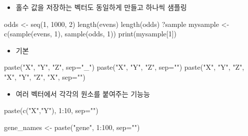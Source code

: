 \documentclass[
]{book}
\newenvironment{Shaded}{\begin{snugshade}}{\end{snugshade}}
\newcommand{\AttributeTok}[1]{\textcolor[rgb]{0.77,0.63,0.00}{#1}}
\newcommand{\DecValTok}[1]{\textcolor[rgb]{0.00,0.00,0.81}{#1}}
\newcommand{\FunctionTok}[1]{\textcolor[rgb]{0.00,0.00,0.00}{#1}}
\newcommand{\NormalTok}[1]{#1}
\newcommand{\OtherTok}[1]{\textcolor[rgb]{0.56,0.35,0.01}{#1}}
\newcommand{\SpecialCharTok}[1]{\textcolor[rgb]{0.00,0.00,0.00}{#1}}
\newcommand{\StringTok}[1]{\textcolor[rgb]{0.31,0.60,0.02}{#1}}
\providecommand{\tightlist}{%
  \setlength{\itemsep}{0pt}\setlength{\parskip}{0pt}}
\begin{document}
\begin{itemize}
\tightlist
\item
  홀수 값을 저장하는 벡터도 동일하게 만들고 하나씩 샘플링
\end{itemize}

\begin{Shaded}
\begin{Highlighting}[]
\NormalTok{odds }\OtherTok{\textless{}{-}} \FunctionTok{seq}\NormalTok{(}\DecValTok{1}\NormalTok{, }\DecValTok{1000}\NormalTok{, }\DecValTok{2}\NormalTok{)}
\FunctionTok{length}\NormalTok{(evens)}
\FunctionTok{length}\NormalTok{(odds)}
\NormalTok{?sample}
\NormalTok{mysample }\OtherTok{\textless{}{-}} \FunctionTok{c}\NormalTok{(}\FunctionTok{sample}\NormalTok{(evens, }\DecValTok{1}\NormalTok{), }\FunctionTok{sample}\NormalTok{(odds, }\DecValTok{1}\NormalTok{))}
\FunctionTok{print}\NormalTok{(mysample[}\DecValTok{1}\NormalTok{])}
\end{Highlighting}
\end{Shaded}

\begin{itemize}
\tightlist
\item
  기본
\end{itemize}

\begin{Shaded}
\begin{Highlighting}[]
\FunctionTok{paste}\NormalTok{(}\StringTok{"X"}\NormalTok{, }\StringTok{"Y"}\NormalTok{, }\StringTok{"Z"}\NormalTok{, }\AttributeTok{sep=}\StringTok{"\_"}\NormalTok{)}
\FunctionTok{paste}\NormalTok{(}\StringTok{"X"}\NormalTok{, }\StringTok{"Y"}\NormalTok{, }\StringTok{"Z"}\NormalTok{, }\AttributeTok{sep=}\StringTok{""}\NormalTok{)}
\FunctionTok{paste}\NormalTok{(}\StringTok{"X"}\NormalTok{, }\StringTok{"Y"}\NormalTok{, }\StringTok{"Z"}\NormalTok{, }\StringTok{"X"}\NormalTok{, }\StringTok{"Y"}\NormalTok{, }\StringTok{"Z"}\NormalTok{, }\StringTok{"X"}\NormalTok{, }\AttributeTok{sep=}\StringTok{""}\NormalTok{)}
\end{Highlighting}
\end{Shaded}

\begin{itemize}
\tightlist
\item
  여러 벡터에서 각각의 원소를 붙여주는 기능능
\end{itemize}

\begin{Shaded}
\begin{Highlighting}[]
\FunctionTok{paste}\NormalTok{(}\FunctionTok{c}\NormalTok{(}\StringTok{"X"}\NormalTok{,}\StringTok{"Y"}\NormalTok{), }\DecValTok{1}\SpecialCharTok{:}\DecValTok{10}\NormalTok{, }\AttributeTok{sep=}\StringTok{""}\NormalTok{)}

\NormalTok{gene\_names }\OtherTok{\textless{}{-}} \FunctionTok{paste}\NormalTok{(}\StringTok{"gene"}\NormalTok{, }\DecValTok{1}\SpecialCharTok{:}\DecValTok{100}\NormalTok{, }\AttributeTok{sep=}\StringTok{""}\NormalTok{)}
\end{Highlighting}
\end{Shaded}
\end{document}
